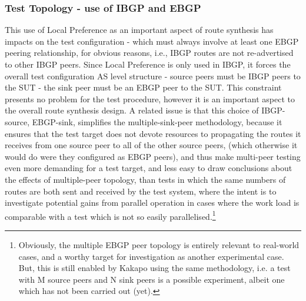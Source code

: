 \subsubsection{Test Topology - use of IBGP and EBGP}
This use of Local Preference as an important aspect of route synthesis has impacts on the test configuration - which must always involve at least one EBGP peering relationship, for obvious reasons, i.e., IBGP routes are not re-advertised to other IBGP peers.
Since Local Preference is only used in IBGP, it forces the overall test configuration AS level structure  - source peers must be IBGP peers to the SUT - the sink peer must be an EBGP peer to the SUT.
This constraint presents no problem for the test procedure, however it is an important aspect to the overall route synthesis design.
A related issue is that this choice of IBGP-source, EBGP-sink, simplifies the multiple-sink-peer methodology, because it ensures that the test target does not devote resources to propagating the routes it receives from one source peer to all of the other source peers, (which otherwise it would do were they configured as EBGP peers), and thus make multi-peer testing even more demanding for a test target, and less easy to draw conclusions about the effects of multiple-peer topology, than tests in which the same numbers of routes are both sent and received by the test system, where the intent is to investigate potential gains from parallel operation in cases where the work load is comparable with a test which is not so easily parallelised.\footnote{Obviously, the multiple EBGP peer topology is entirely relevant to real-world cases, and a worthy target for investigation as another experimental case.
But, this is still enabled by Kakapo using the same methodology, i.e. a test with M source peers and N sink peers is a possible experiment, albeit one which has not been carried out (yet).}

